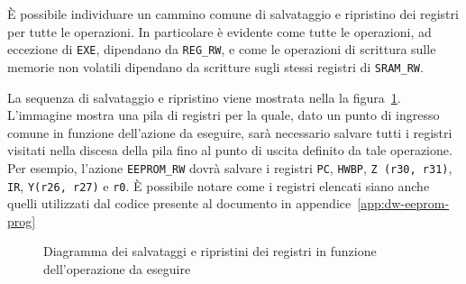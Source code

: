 È possibile individuare un cammino comune di salvataggio e ripristino dei registri per tutte le operazioni. In particolare è evidente come tutte le operazioni, ad eccezione di \texttt{EXE}, dipendano da \texttt{REG\_RW}, e come le operazioni di scrittura sulle memorie non volatili dipendano da scritture sugli stessi registri di \texttt{SRAM\_RW}.

La sequenza di salvataggio e ripristino viene mostrata nella la figura~\ref{fig:dw-wrt-seq}. L'immagine mostra una pila di registri per la quale, dato un punto di ingresso comune in funzione dell'azione da eseguire, sarà necessario salvare tutti i registri visitati nella discesa della pila fino al punto di uscita definito da tale operazione. Per esempio, l'azione \texttt{EEPROM\_RW} dovrà salvare i registri \texttt{PC}, \texttt{HWBP}, \texttt{Z (r30, r31)}, \texttt{IR}, \texttt{Y(r26, r27)} e \texttt{r0}. È possibile notare come i registri elencati siano anche quelli utilizzati dal codice presente al documento in appendice~\ref{app:dw-eeprom-prog}

\begin{figure}[h]
    \centering

    \caption[]{Diagramma dei salvataggi e ripristini dei registri in funzione dell'operazione da eseguire}\label{fig:dw-wrt-seq}
\end{figure}

